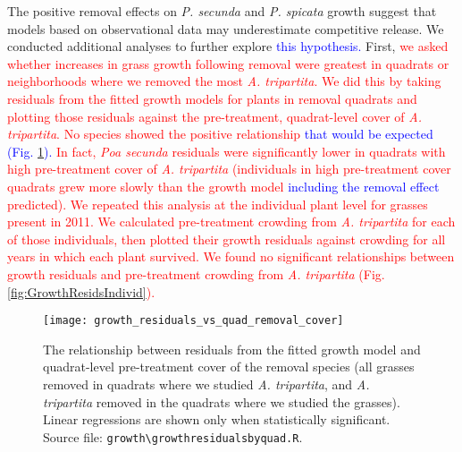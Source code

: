 \documentclass[11pt]{article}
\newcommand{\new}{\textcolor{red}}
\newcommand{\spe}{\textcolor{blue}}
\begin{document}
\begin{doublespacing}
The positive removal effects on \textit{P. secunda}  and \textit{P. spicata} growth suggest that models based on observational data may underestimate competitive release. We conducted additional analyses to further explore \spe{this hypothesis.} 
First, \new{we asked whether increases in grass growth following removal were greatest in quadrats or neighborhoods where we removed the most \textit{A. tripartita}. We did this by taking residuals from the fitted growth models for plants in removal quadrats and plotting those residuals against the pre-treatment, quadrat-level cover of \textit{A. tripartita}. No species showed the positive relationship 
\spe{that would be expected (Fig. \ref{fig:GrowthResidsQuad}).} 
In fact, \textit{Poa secunda} residuals were significantly lower in quadrats with high pre-treatment cover of \textit{A. tripartita} (individuals in high pre-treatment cover quadrats grew more slowly than the growth model 
\spe{including the removal effect} predicted). We repeated this analysis at the individual plant level for grasses present in 2011. We calculated pre-treatment crowding from \textit{A. tripartita} for each of those individuals, then plotted their growth residuals against crowding for all years in which each plant survived. We found no significant relationships between growth residuals and pre-treatment crowding from \textit{A. tripartita} (Fig. \ref{fig:GrowthResidsIndivid}). }

\begin{figure}[tbp]
\centering
\texttt{[image: growth\_residuals\_vs\_quad\_removal\_cover]}
\caption{The relationship between residuals from the fitted growth model and quadrat-level pre-treatment cover of the removal species (all grasses removed in quadrats where we studied \textit{A. tripartita}, and \textit{A. tripartita} removed in the quadrats where we studied the grasses). Linear regressions are shown only when statistically significant. Source file:  \texttt{growth\textbackslash growth\textunderscore residuals\textunderscore by\textunderscore quad.R}.}
\label{fig:GrowthResidsQuad}
\end{figure}



\end{doublespacing}
\end{document}
